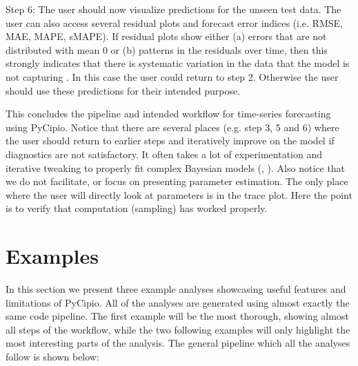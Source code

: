 \documentclass{article}
\begin{document}
Step 6: The user should now visualize predictions for the unseen test data. The user can also access several residual plots and forecast error indices (i.e. RMSE, MAE, MAPE, sMAPE). If residual plots show either (a) errors that are not distributed with mean 0 or (b) patterns in the residuals over time, then this strongly indicates that there is systematic variation in the data that the model is not capturing \cite{fpp3}. In this case the user could return to step 2. Otherwise the user should use these predictions for their intended purpose. 

This concludes the pipeline and intended workflow for time-series forecasting using PyCipio. Notice that there are several places (e.g. step 3, 5 and 6) where the user should return to earlier steps and iteratively improve on the model if diagnostics are not satisfactory. It often takes a lot of experimentation and iterative tweaking to properly fit complex Bayesian models (, ). Also notice that we do not facilitate, or focus on presenting parameter estimation. The only place where the user will directly look at parameters is in the trace plot. Here the point is to verify that computation (sampling) has worked properly. 

\section{Examples}

In this section we present three example analyses showcasing useful features and limitations of PyCipio. All of the analyses are generated using almost exactly the same code pipeline. The first example will be the most thorough, showing almost all steps of the workflow, while the two following examples will only highlight the most interesting parts of the analysis. The general pipeline which all the analyses follow is shown below: 

\lstset{frame=lines}
\end{document}
